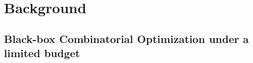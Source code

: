 \documentclass[runningheads]{llncs}
\begin{document}
%
%
%
%
%
%
\newcommand{\Prob}{\ensuremath{p}}
\newcommand{\minit}{\ensuremath{m_\text{ini}}\xspace}
\newcommand{\FEmax}{\ensuremath{\textit{FE}_{\max}}}


\section{Background}\label{sec:backgroud}



\subsection{Black-box Combinatorial Optimization under a limited budget}
\end{document}
